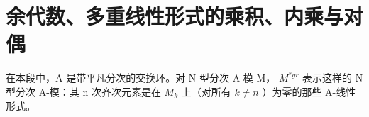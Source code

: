 \section{余代数、多重线性形式的乘积、内乘与对偶}

在本段中，A 是带平凡分次的交换环。对 N 型分次 A-模 M， \(M^{*gr}\) 表示这样的 N 型分次 A-模：其 n 次齐次元素是在 \(M_{k}\) 上（对所有 \(k \neq n\) ）为零的那些 A-线性形式。

